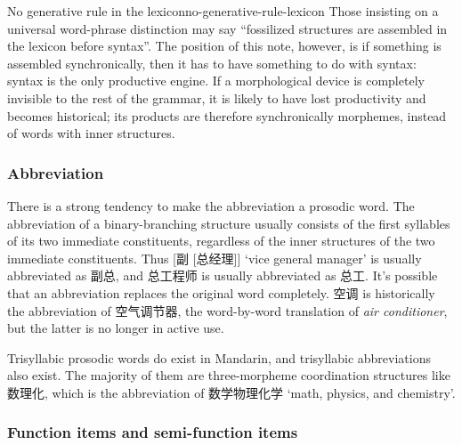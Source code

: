 \documentclass[UTF8, a4paper, oneside, scheme=plain]{ctexrep}
\newcommand{\corpus}[1]{\emph{#1}}
\newcommand{\translate}[1]{`#1'}
\begin{document}
\begin{theorybox}{No generative rule in the lexicon}{no-generative-rule-lexicon}
    Those insisting on a universal word-phrase distinction 
    may say ``fossilized structures are assembled in the lexicon before syntax''.
    The position of this note, however, is if something is assembled synchronically,
    then it has to have something to do with syntax:
    syntax is the only productive engine.
    If a morphological device is completely invisible to the rest of the grammar,
    it is likely to have lost productivity and becomes historical; 
    its products are therefore synchronically morphemes, 
    instead of words with inner structures.
\end{theorybox}

\subsubsection{Abbreviation}\label{sec:pos.morpheme.abbreviation}

There is a strong tendency to make the abbreviation a prosodic word.
The abbreviation of a binary-branching structure
usually consists of the first syllables of its two immediate constituents,
regardless of the inner structures of the two immediate constituents.
Thus [副 [总经理]] \translate{vice general manager} is usually abbreviated as 副总, 
and 总工程师 is usually abbreviated as 总工.
It's possible that an abbreviation replaces the original word completely.
空调 is historically the abbreviation of 空气调节器, 
the word-by-word translation of \corpus{air conditioner},
but the latter is no longer in active use.

Trisyllabic prosodic words do exist in Mandarin, 
and trisyllabic abbreviations also exist.
The majority of them are three-morpheme coordination structures like 数理化, 
which is the abbreviation of 
数学物理化学 \translate{math, physics, and chemistry}.

\subsubsection{Function items and semi-function items} 
\end{document}
